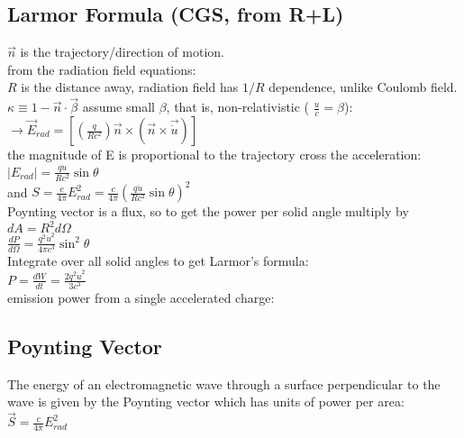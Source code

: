 \documentclass[12pt]{report}
\begin{document}
\subsection{Larmor Formula (CGS, from R+L)}
$\vec{n}$ is the trajectory/direction of motion.\\
from the radiation field equations:\\
$R$ is the distance away,  radiation field has $1/R$ dependence, unlike Coulomb field.\\
\(\kappa\equiv 1-\vec{n}\cdot\vec{\beta}\) 
assume small $\beta$, that is, non-relativistic ( \(\frac{u}{c}=\beta\)):\\
\(\rightarrow \vec{E}_{rad}=[(\frac{q}{Rc^2})\vec{n}\times(\vec{n}\times\vec{\dot{u}})]\)\\
the magnitude of E is proportional to the trajectory cross the acceleration:\\
\(|E_{rad}|=\frac{q\dot{u}}{Rc^2}\sin\theta\)\\

and \(S=\frac{c}{4\pi}E_{rad}^2=\frac{c}{4\pi}(\frac{q\dot{u}}{Rc^2}\sin\theta)^2\)\\

Poynting vector is a flux, so to get the power per solid angle multiply by $dA=R^2d\Omega$\\

\(\frac{dP}{d\Omega}=\frac{q^2\dot{u}^2}{4\pi c^3}\sin^2\theta\)\\

Integrate over all solid angles to get Larmor's formula:\\
\(\boxed{ P=\frac{dW}{dt}=\frac{2q^2\dot{u}^2}{3c^3}}\)\\ 
emission power from a single accelerated charge:\\

 
 \subsection{Poynting Vector}
The energy of an electromagnetic wave through a surface perpendicular to the wave is given by the Poynting vector which has units of power per area: \\
\(\boxed{\vec{S}=\frac{c}{4\pi}E_{rad}^2}\)
\end{document}
